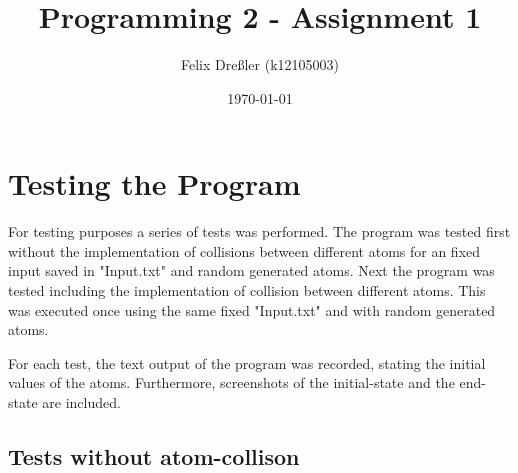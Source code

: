\documentclass[11pt,titlepage]{article}
\title{Programming 2 - Assignment 1}
\author{Felix Dreßler (k12105003)}
\date{\today} %
\begin{document}
\maketitle
	\section{Testing the Program}
		For testing purposes a series of tests was performed. The program was tested first without the implementation of collisions between different atoms for an fixed input saved in "Input.txt" and random generated atoms.
		Next the program was tested including the implementation of collision between different atoms. This was executed once using the same fixed "Input.txt" and with random generated atoms.
		
		For each test, the text output of the program was recorded, stating the initial values of the atoms. Furthermore, screenshots of the initial-state and the end-state are included.
		\subsection{Tests without atom-collison}
\end{document}
